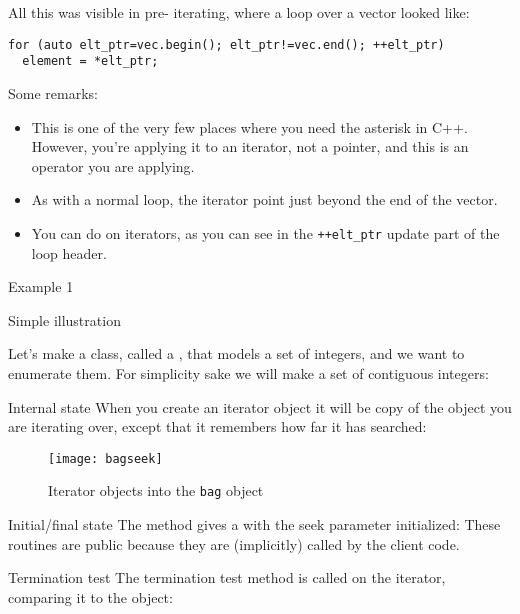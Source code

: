 All this was visible in pre- iterating,
where a loop over a vector looked like:
\begin{lstlisting}
for (auto elt_ptr=vec.begin(); elt_ptr!=vec.end(); ++elt_ptr)
  element = *elt_ptr;
\end{lstlisting}
Some remarks:
\begin{itemize}
\item This is one of the very few places where you need the asterisk in C++.
  However, you're applying it to an iterator, not a pointer,
  and this is an operator you are applying.
\item As with a normal loop, the  iterator point just beyond the end
  of the vector.
\item You can do  on iterators, as
  you can see in the \lstinline|++elt_ptr| update part of the loop header.
\end{itemize}

 {Example 1}

\begin{block}{Simple illustration}
  \label{sl:bagdata}
  
  Let's make a class, called a , that models a set of integers,
  and we want to enumerate them. For simplicity sake we will make a set
  of contiguous integers:
\end{block}

\begin{block}{Internal state}
  \label{sl:bagseek}
  When you create an iterator object it will be copy of the object you
  are iterating over, except that it remembers how far it has
  searched:
\end{block}

\begin{figure}[ht]
  \texttt{[image: bagseek]}
  \caption{Iterator objects into the \lstinline{bag} object}
  \label{fig:bagseek-iter}
\end{figure}

\begin{block}{Initial/final state}
  \label{sl:bagbeginend}
  The  method gives a  with the seek parameter
  initialized:
  These routines are public because they are (implicitly) called by the
  client code.
\end{block}

\begin{block}{Termination test}
  \label{sl:bagtest}
  The termination test method is called on the iterator, comparing it to
  the  object:
\end{block}

